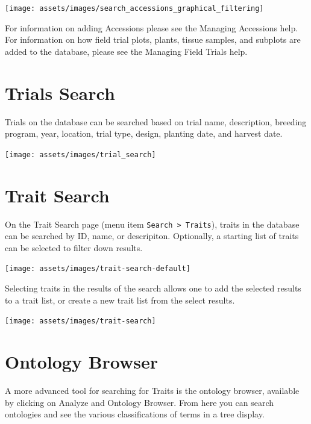 \documentclass[
  12pt,
]{book}
\begin{document}
\begin{center}\texttt{[image: assets/images/search\_accessions\_graphical\_filtering]} \end{center}

For information on adding Accessions please see the Managing Accessions help. For information on how field trial plots, plants, tissue samples, and subplots are added to the database, please see the Managing Field Trials help.

\hypertarget{trials-search}{%
\section{Trials Search}\label{trials-search}}

Trials on the database can be searched based on trial name, description, breeding program, year, location, trial type, design, planting date, and harvest date.

\begin{center}\texttt{[image: assets/images/trial\_search]} \end{center}

\hypertarget{trait-search}{%
\section{Trait Search}\label{trait-search}}

On the Trait Search page (menu item \texttt{Search\ \textgreater{}\ Traits}), traits in the database can be searched by ID, name, or descripiton. Optionally, a starting list of traits can be selected to filter down results.

\begin{center}\texttt{[image: assets/images/trait-search-default]} \end{center}

Selecting traits in the results of the search allows one to add the selected results to a trait list, or create a new trait list from the select results.

\begin{center}\texttt{[image: assets/images/trait-search]} \end{center}

\hypertarget{ontology-browser}{%
\section{Ontology Browser}\label{ontology-browser}}

A more advanced tool for searching for Traits is the ontology browser, available by clicking on Analyze and Ontology Browser. From here you can search ontologies and see the various classifications of terms in a tree display.
\end{document}
